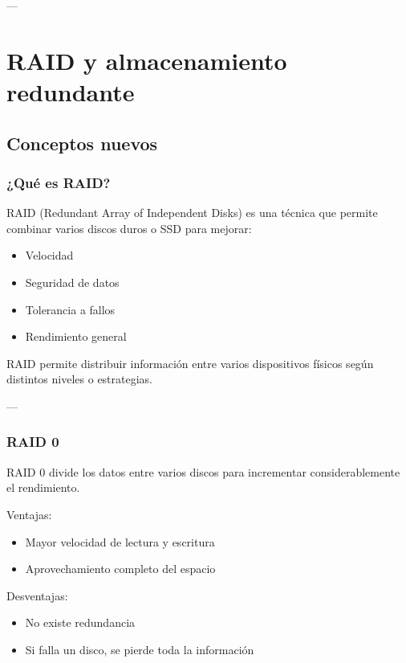 \documentclass[11pt, letterpaper]{article}
\begin{document}
---
\section{RAID y almacenamiento redundante}
\label{sec:orgd983531}

\subsection{Conceptos nuevos}
\label{sec:orgbd832ee}

\subsubsection{¿Qué es RAID?}
\label{sec:org76aa902}

RAID (Redundant Array of Independent Disks) es una técnica que permite combinar varios discos duros o SSD para mejorar:

\begin{itemize}
\item Velocidad
\item Seguridad de datos
\item Tolerancia a fallos
\item Rendimiento general
\end{itemize}

RAID permite distribuir información entre varios dispositivos físicos según distintos niveles o estrategias.

---
\subsubsection{RAID 0}
\label{sec:org2a48b40}

RAID 0 divide los datos entre varios discos para incrementar considerablemente el rendimiento.

Ventajas:

\begin{itemize}
\item Mayor velocidad de lectura y escritura
\item Aprovechamiento completo del espacio
\end{itemize}

Desventajas:

\begin{itemize}
\item No existe redundancia
\item Si falla un disco, se pierde toda la información
\end{itemize}
\end{document}
